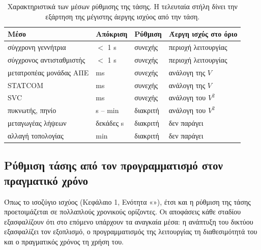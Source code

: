 \begin{table}[!htbp]
\centering
\begin{tabular}{llll}
\hline
Μέσο & Απόκριση & Ρύθμιση & Άεργη ισχύς στο όριο \\
\hline
σύγχρονη γεννήτρια & $<$ 1 s & συνεχής & περιοχή λειτουργίας \\
σύγχρονος αντισταθμιστής & $<$ 1 s & συνεχής & περιοχή λειτουργίας \\
μετατροπέας μονάδας ΑΠΕ & ms & συνεχής & ανάλογη της $V$ \\
STATCOM & ms & συνεχής & ανάλογη της $V$ \\
SVC & ms & συνεχής & ανάλογη του $V^2$ \\
πυκνωτής, πηνίο & s -- min & διακριτή & ανάλογη του $V^2$ \\
μεταγωγέας λήψεων & δεκάδες s & διακριτή & δεν παράγει \\
αλλαγή τοπολογίας & min & διακριτή & δεν παράγει \\
\hline
\end{tabular}
\caption{Χαρακτηριστικά των μέσων ρύθμισης της τάσης. Η τελευταία στήλη δίνει την εξάρτηση της
μέγιστης άεργης ισχύος από την τάση.}
\label{tab:v-means}
\end{table}

\subsection{Ρύθμιση τάσης από τον προγραμματισμό στον πραγματικό χρόνο}
\label{sec:v-stages}

Όπως το ισοζύγιο ισχύος (Κεφάλαιο 1, Ενότητα «»), έτσι και η ρύθμιση της
τάσης προετοιμάζεται σε πολλαπλούς χρονικούς ορίζοντες. Οι αποφάσεις κάθε σταδίου εξασφαλίζουν
ότι στο επόμενο υπάρχουν τα αναγκαία μέσα: η ανάπτυξη του δικτύου εξασφαλίζει τον εξοπλισμό, ο
προγραμματισμός της λειτουργίας τη διαθεσιμότητά του και ο πραγματικός χρόνος τη χρήση του.

